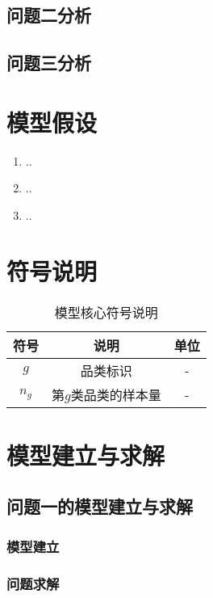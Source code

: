 \documentclass[withoutpreface,bwprint]{cumcmthesis} %
\begin{document}
\subsection{问题二分析}

\subsection{问题三分析}

\section{模型假设}

\begin{enumerate}
    \item ..
    \item ..
    \item ..
\end{enumerate}

\section{符号说明}
\begin{table}[H]
    \centering
    \caption{模型核心符号说明}
    \label{表标签}
    \begin{tabular}{ccc} 
        \toprule[1.5pt]
        \textbf{符号} & \textbf{说明} & \textbf{单位} \\
        \midrule[1pt]
        $g$ & 品类标识 & - \\
        $n_g$ & 第$g$类品类的样本量 & - \\
        \bottomrule[1.5pt]
    \end{tabular}
\end{table}

\section{模型建立与求解}
\subsection{问题一的模型建立与求解}
\subsubsection{模型建立}
\subsubsection{问题求解}
\end{document}
